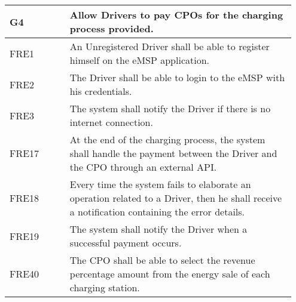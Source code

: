 {\renewcommand{\arraystretch}{1.5}
\begin{longtable}{|p{0.20\linewidth}p{0.75\linewidth} |}
    \hline
    \rowcolor{bluepoli!40}\textbf{G4} & \textbf{Allow Drivers to pay CPOs for the charging process provided.} \\
    \hline
    \rowcolor{bluepoli!15} FRE1 & An Unregistered Driver shall be able to register himself on the eMSP application. \\
    \hline
    \rowcolor{bluepoli!15} FRE2 & The Driver shall be able to login to the eMSP with his credentials. \\
    \hline 
    \rowcolor{bluepoli!15} FRE3 & The system shall notify the Driver if there is no internet connection. \\
    \hline 
    \rowcolor{bluepoli!15} FRE17 & At the end of the charging process, the system shall handle the payment between the Driver and the CPO through an external API. \\
    \hline
    \rowcolor{bluepoli!15} FRE18 & Every time the system fails to elaborate an operation related to a Driver, then he shall receive a notification containing the error details. \\
    \hline
    \rowcolor{bluepoli!15} FRE19 & The system shall notify the Driver when a successful payment occurs. \\
    \hline
    \rowcolor{bluepoli!15} FRE40& The CPO shall be able to select the revenue percentage amount from the energy sale of each charging station. \\
    

\end{longtable}}
